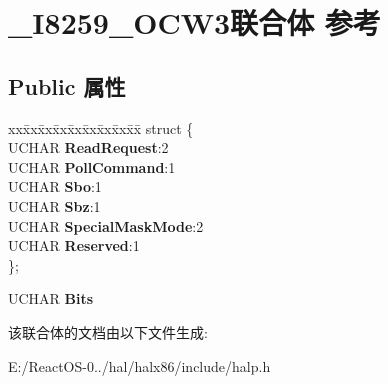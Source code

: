 \hypertarget{union___i8259___o_c_w3}{}\section{\+\_\+\+I8259\+\_\+\+O\+C\+W3联合体 参考}
\label{union___i8259___o_c_w3}
\subsection*{Public 属性}
\begin{DoxyCompactItemize}
\item 
\mbox{\label{union___i8259___o_c_w3_a4da432e18f1f802cedc101a1ae823dd6}} 
\begin{tabbing}
xx\=xx\=xx\=xx\=xx\=xx\=xx\=xx\=xx\=\kill
struct \{\\
\>UCHAR {\bfseries ReadRequest}:2\\
\>UCHAR {\bfseries PollCommand}:1\\
\>UCHAR {\bfseries Sbo}:1\\
\>UCHAR {\bfseries Sbz}:1\\
\>UCHAR {\bfseries SpecialMaskMode}:2\\
\>UCHAR {\bfseries Reserved}:1\\
\}; \\

\end{tabbing}\item 
\mbox{\label{union___i8259___o_c_w3_a7df48b4c842120782f6c9280fcdc5114}} 
U\+C\+H\+AR {\bfseries Bits}
\end{DoxyCompactItemize}


该联合体的文档由以下文件生成\+:\begin{DoxyCompactItemize}
\item 
E\+:/\+React\+O\+S-\/0../hal/halx86/include/halp.\+h\end{DoxyCompactItemize}
